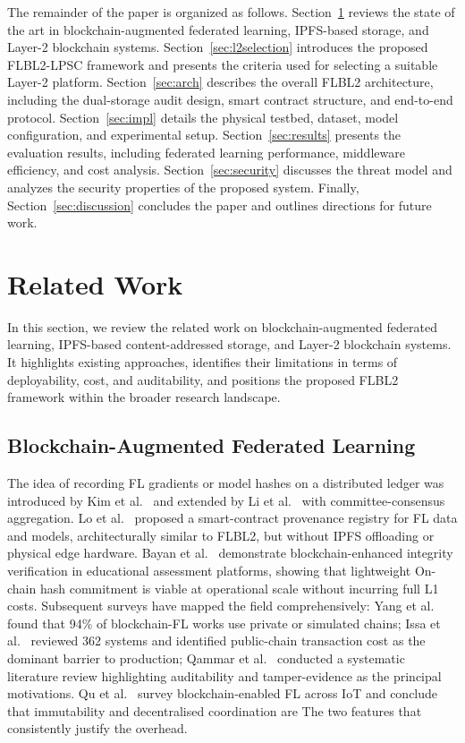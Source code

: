 \documentclass{llncs}
\begin{document}
The remainder of the paper is organized as follows. Section~\ref{sec:related} reviews the state of the art in blockchain-augmented federated learning, IPFS-based storage, and Layer-2 blockchain systems. Section~\ref{sec:l2selection} introduces the proposed FLBL2-LPSC framework and presents the criteria used for selecting a suitable Layer-2 platform. Section~\ref{sec:arch} describes the overall FLBL2 architecture, including the dual-storage audit design, smart contract structure, and end-to-end protocol. Section~\ref{sec:impl} details the physical testbed, dataset, model configuration, and experimental setup. Section~\ref{sec:results} presents the evaluation results, including federated learning performance, middleware efficiency, and cost analysis. Section~\ref{sec:security} discusses the threat model and analyzes the security properties of the proposed system. Finally, Section~\ref{sec:discussion} concludes the paper and outlines directions for future work.


\FloatBarrier
\section{Related Work}
\label{sec:related}
In this section, we review the related work on blockchain-augmented federated learning, IPFS-based content-addressed storage, and Layer-2 blockchain systems. It highlights existing approaches, identifies their limitations in terms of deployability, cost, and auditability, and positions the proposed FLBL2 framework within the broader research landscape.

\subsection{Blockchain-Augmented Federated Learning}
The idea of recording FL gradients or model hashes on a distributed ledger
was introduced by Kim et al.~\cite{kim2019blockchained} and extended
by Li et al.~\cite{li2020blockchained} with committee-consensus aggregation.
Lo et al.~\cite{lo2021trustworthy} proposed a smart-contract provenance
registry for FL data and models, architecturally similar to FLBL2, but
without IPFS offloading or physical edge hardware. Bayan et
al.~\cite{bayan2024blockchain} demonstrate blockchain-enhanced integrity
verification in educational assessment platforms, showing that lightweight
On-chain hash commitment is viable at operational scale without incurring
full L1 costs. Subsequent surveys have
mapped the field comprehensively: Yang et al.~\cite{yang2024blockchain} found
that 94\% of blockchain-FL works use private or simulated chains;
Issa et al.~\cite{issa2023survey} reviewed 362 systems and identified
public-chain transaction cost as the dominant barrier to production;
Qammar et al.~\cite{qammar2023securing} conducted a systematic literature
review highlighting auditability and tamper-evidence as the principal
motivations. Qu et al.~\cite{qu2022blockchain} survey blockchain-enabled FL
across IoT and conclude that immutability and decentralised coordination are
The two features that consistently justify the overhead.
\end{document}
